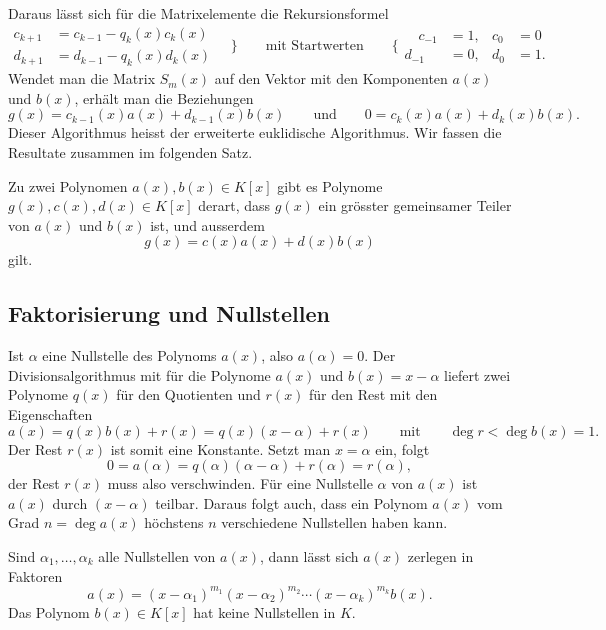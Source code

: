 Daraus lässt sich für die Matrixelemente die Rekursionsformel
\[
\begin{aligned}
c_{k+1} &= c_{k-1} - q_k(x) c_k(x) \\
d_{k+1} &= d_{k-1} - q_k(x) d_k(x)
\end{aligned}
\quad
\bigg\}
\qquad
\text{mit Startwerten}
\qquad
\bigg\{
\begin{aligned}
\quad
c_{-1} &= 1, & c_0 &= 0 \\
d_{-1} &= 0, & d_0 &= 1.
\end{aligned}
\]
Wendet man die Matrix $S_m(x)$ auf den Vektor mit den Komponenten
$a(x)$ und $b(x)$, erhält man die Beziehungen
\[
g(x) = c_{k-1}(x) a(x) + d_{k-1}(x) b(x)
\qquad\text{und}\qquad
0 = c_k(x) a(x) + d_k(x) b(x).
\]
Dieser Algorithmus heisst der erweiterte euklidische Algorithmus.
Wir fassen die Resultate zusammen im folgenden Satz.

\begin{satz}
Zu zwei Polynomen $a(x),b(x) \in K[x]$ gibt es Polynome
$g(x),c(x),d(x)\in K[x]$
derart, dass $g(x)$ ein grösster gemeinsamer Teiler von $a(x)$ und $b(x)$
ist, und ausserdem
\[
g(x) = c(x)a(x)+d(x)b(x)
\]
gilt.
\end{satz}

%
%
\subsection{Faktorisierung und Nullstellen
\label{buch:polynome:subsection:faktorisierung-und-nullstellen}}
Ist $\alpha$ eine Nullstelle des Polynoms $a(x)$, also $a(\alpha)=0$.
Der Divisionsalgorithmus mit für die Polynome $a(x)$ und $b(x)=x-\alpha$
liefert zwei Polynome $q(x)$ für den Quotienten und $r(x)$ für den Rest
mit den Eigenschaften
\[
a(x)
=
q(x) b(x)
+r(x)
=
q(x)(x-\alpha)+r(x)
\qquad\text{mit}\qquad
\deg r < \deg b(x)=1.
\]
Der Rest $r(x)$ ist somit eine Konstante. 
Setzt man $x=\alpha$ ein, folgt
\[
0
=
a(\alpha)
=
q(\alpha)(\alpha-\alpha)+r(\alpha)
=
r(\alpha),
\]
der Rest $r(x)$ muss also verschwinden.
Für eine Nullstelle $\alpha$ von $a(x)$ ist $a(x)$ durch $(x-\alpha)$
teilbar.
Daraus folgt auch, dass ein Polynom $a(x)$ vom Grad $n=\deg a(x)$ höchstens
$n$ verschiedene Nullstellen haben kann.

Sind $\alpha_1,\dots,\alpha_k$ alle Nullstellen von $a(x)$, dann lässt
sich $a(x)$ zerlegen in Faktoren
\[
a(x)
=
(x-\alpha_1)^{m_1}
(x-\alpha_2)^{m_2}
\cdots
(x-\alpha_k)^{m_k}
b(x).
\]
Das Polynom $b(x)\in K[x]$ hat keine Nullstellen in $K$.

